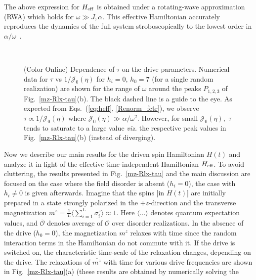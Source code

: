\documentclass[reprint,preprintnumbers,showpacs,amsmath,twocolumn,showkeys,aps,prl]{revtex4-1}
\begin{document}
The above expression for $H_{\rm eff}$ is obtained under a rotating-wave approximation
(RWA) which holds for $\omega \gg J,\alpha.$ This effective Hamiltonian accurately reproduces the dynamics 
of the full system stroboscopically to the lowest order in $\alpha/\omega$~\cite{suppl}.
\begin{figure}[htb]
\ 
\caption{(Color Online) Dependence of $\tau$ on the drive parameters.
Numerical data for $\tau$ vs $1/{\mathcal J}_{0}(\eta)$ for $h_{i}=0$, $h_{0}=7$ 
(for a single random realization) are shown for the range of $\omega$ around the peaks $P_{1,2,3}$ 
of Fig.~\ref{mz-Rlx-tau}(b). The black dashed line is a guide to the eye. 
As expected from Eqs.~(\ref{eq:heff}, \ref{Renorm_fctr}),
we observe $\tau \propto 1/{\mathcal J}_{0}(\eta)$ where ${\mathcal J}_{0}(\eta) \gg  \alpha/\omega^{2}$.
However, for small ${\mathcal J}_{0}(\eta),$ $\tau$ tends to saturate to a large value \textit{viz.} the respective 
peak values in Fig.~\ref{mz-Rlx-tau}(b) (instead of diverging).}
\label{tau-vs-J0}
\end{figure}
Now we describe our main results for the driven spin Hamiltonian $H(t)$ 
and analyze it in light of the effective time-independent Hamiltonian $H_{\rm eff}$.
To avoid cluttering, the results presented in Fig.~\ref{mz-Rlx-tau} and the main discussion
are focused on the case where the field disorder is absent ($h_{i}=0$), the case with $h_{i}\ne 0$ is given afterwards.
Imagine that the spins [in $H(t)$] are initially prepared in a state strongly polarized in the $+z$-direction 
and the transverse magnetization $ m^{z} = \frac{1}{L}\langle\sum_{i=1}^{L}\sigma_{i}^{z}\rangle \approx 1$. 
Here $\langle ... \rangle$ denotes quantum expectation values, 
and $\overline{{\mathcal O}}$ denotes average of ${\mathcal O}$ over disorder realizations.
In the absence of the drive ($h_{0}=0$), the magnetization $m^z$ relaxes with time since the random interaction terms in the Hamiltonian do not commute with it. If the drive is switched on, the characteristic time-scale of the relaxation 
changes, depending on the drive. The relaxations of $\overline{m^{z}}$ with time for various drive 
frequencies are shown in Fig.~\ref{mz-Rlx-tau}(a) (these results are obtained by numerically solving the 
\end{document}
